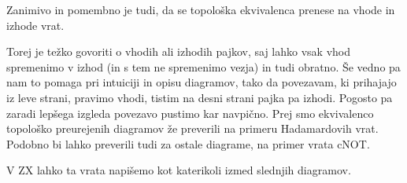 \documentclass[mat1]{fmfdelo}
\begin{document}
Zanimivo in pomembno je tudi, da se topološka ekvivalenca prenese na vhode in izhode vrat.
\begin{center}
\end{center}
Torej je težko govoriti o vhodih ali izhodih pajkov, saj lahko vsak vhod spremenimo v izhod (in s tem ne spremenimo vezja) in tudi obratno. Še vedno pa nam to pomaga pri intuiciji in opisu diagramov, tako da povezavam, ki prihajajo iz leve strani, pravimo vhodi, tistim na desni strani pajka pa izhodi. Pogosto pa zaradi lepšega izgleda povezavo pustimo kar navpično. Prej smo ekvivalenco topološko preurejenih diagramov že preverili na primeru Hadamardovih vrat. Podobno bi lahko preverili tudi za ostale diagrame, na primer vrata \textsf{cNOT}. 
\begin{center}
\end{center}
V ZX lahko ta vrata napišemo kot katerikoli izmed slednjih diagramov.
\end{document}
